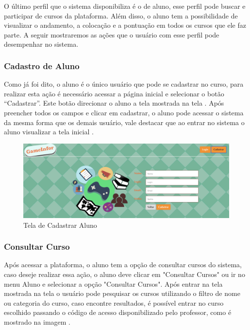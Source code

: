 O último perfil que o sistema disponibiliza é o de aluno, esse perfil pode buscar e participar de cursos da plataforma. Além disso, o aluno tem a possibilidade de visualizar o andamento, a colocação e a pontuação em todos os cursos que ele faz parte. A seguir mostraremos as ações que o usuário com esse perfil pode desempenhar no sistema.

\subsubsection{Cadastro de Aluno}

Como já foi dito, o aluno é o único usuário que pode se cadastrar no curso, para realizar esta ação é necessário acessar a página inicial e selecionar o botão “Cadastrar”. Este botão direcionar o aluno a tela mostrada na tela . Após preencher todos os campos e clicar em cadastrar, o aluno pode acessar o sistema da mesma forma que os demais usuário, vale destacar que ao entrar no sistema o aluno visualizar a tela inicial .

\begin{figure}[H]
  \centering
  \includegraphics[scale=0.4]{images/proposta-img/Figura4-35.png}
  \caption{Tela de Cadastrar Aluno}
  \label{fig:Figura4-35}
\end{figure}

\subsubsection{Consultar Curso}

Após acessar a plataforma, o aluno tem a opção de consultar cursos do sistema, caso deseje realizar essa ação, o aluno deve clicar em "Consultar Cursos" ou ir no menu Aluno e selecionar a opção "Consultar Cursos". Após entrar na tela mostrada na tela  o usuário pode pesquisar os cursos utilizando o filtro de nome ou categoria do curso, caso encontre resultados, é possível entrar no curso escolhido passando o código de acesso disponibilizado pelo professor, como é mostrado na imagem .

